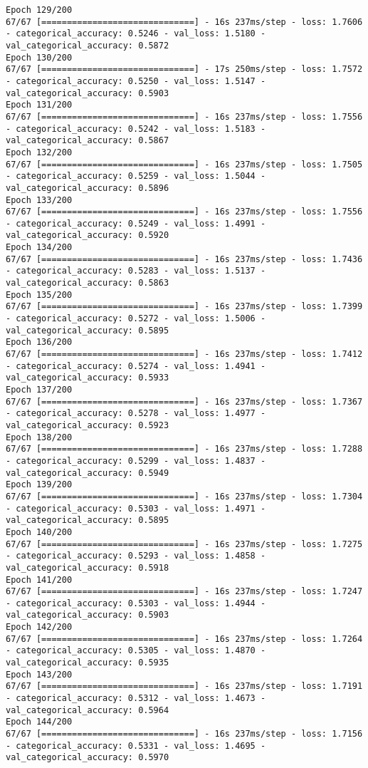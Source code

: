 \begin{lstlisting}
Epoch 129/200
67/67 [==============================] - 16s 237ms/step - loss: 1.7606 - categorical_accuracy: 0.5246 - val_loss: 1.5180 - val_categorical_accuracy: 0.5872
Epoch 130/200
67/67 [==============================] - 17s 250ms/step - loss: 1.7572 - categorical_accuracy: 0.5250 - val_loss: 1.5147 - val_categorical_accuracy: 0.5903
Epoch 131/200
67/67 [==============================] - 16s 237ms/step - loss: 1.7556 - categorical_accuracy: 0.5242 - val_loss: 1.5183 - val_categorical_accuracy: 0.5867
Epoch 132/200
67/67 [==============================] - 16s 237ms/step - loss: 1.7505 - categorical_accuracy: 0.5259 - val_loss: 1.5044 - val_categorical_accuracy: 0.5896
Epoch 133/200
67/67 [==============================] - 16s 237ms/step - loss: 1.7556 - categorical_accuracy: 0.5249 - val_loss: 1.4991 - val_categorical_accuracy: 0.5920
Epoch 134/200
67/67 [==============================] - 16s 237ms/step - loss: 1.7436 - categorical_accuracy: 0.5283 - val_loss: 1.5137 - val_categorical_accuracy: 0.5863
Epoch 135/200
67/67 [==============================] - 16s 237ms/step - loss: 1.7399 - categorical_accuracy: 0.5272 - val_loss: 1.5006 - val_categorical_accuracy: 0.5895
Epoch 136/200
67/67 [==============================] - 16s 237ms/step - loss: 1.7412 - categorical_accuracy: 0.5274 - val_loss: 1.4941 - val_categorical_accuracy: 0.5933
Epoch 137/200
67/67 [==============================] - 16s 237ms/step - loss: 1.7367 - categorical_accuracy: 0.5278 - val_loss: 1.4977 - val_categorical_accuracy: 0.5923
Epoch 138/200
67/67 [==============================] - 16s 237ms/step - loss: 1.7288 - categorical_accuracy: 0.5299 - val_loss: 1.4837 - val_categorical_accuracy: 0.5949
Epoch 139/200
67/67 [==============================] - 16s 237ms/step - loss: 1.7304 - categorical_accuracy: 0.5303 - val_loss: 1.4971 - val_categorical_accuracy: 0.5895
Epoch 140/200
67/67 [==============================] - 16s 237ms/step - loss: 1.7275 - categorical_accuracy: 0.5293 - val_loss: 1.4858 - val_categorical_accuracy: 0.5918
Epoch 141/200
67/67 [==============================] - 16s 237ms/step - loss: 1.7247 - categorical_accuracy: 0.5303 - val_loss: 1.4944 - val_categorical_accuracy: 0.5903
Epoch 142/200
67/67 [==============================] - 16s 237ms/step - loss: 1.7264 - categorical_accuracy: 0.5305 - val_loss: 1.4870 - val_categorical_accuracy: 0.5935
Epoch 143/200
67/67 [==============================] - 16s 237ms/step - loss: 1.7191 - categorical_accuracy: 0.5312 - val_loss: 1.4673 - val_categorical_accuracy: 0.5964
Epoch 144/200
67/67 [==============================] - 16s 237ms/step - loss: 1.7156 - categorical_accuracy: 0.5331 - val_loss: 1.4695 - val_categorical_accuracy: 0.5970

\end{lstlisting}
